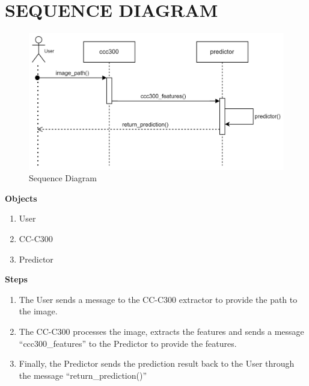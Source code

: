 \section{SEQUENCE DIAGRAM}
\begin{figure}[H]
    \centering
    \includegraphics[width=120mm]{./img/sequenceDiagram.png}
    \caption{Sequence Diagram}
\end{figure}
\large{\textbf{Objects}}
\begin{enumerate}[noitemsep]
    \item User
    \item CC-C300
    \item Predictor
\end{enumerate}
\clearpage
\large{\textbf{Steps}}
\begin{enumerate}[noitemsep]
    \item The User sends a message to the CC-C300 extractor to provide the path to the image.
    \item The CC-C300 processes the image, extracts the features and sends a message ``ccc300\_features'' to the Predictor to provide the features.
    \item Finally, the Predictor sends the prediction result back to the User through the message ``return\_prediction()''
\end{enumerate}

